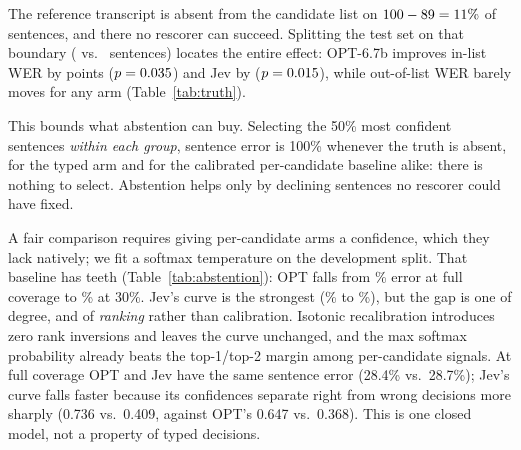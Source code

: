 \documentclass[11pt]{article}
\begin{document}
\begin{table}[t]
\centering\small

\caption{Test WER split by whether the reference transcript is in the candidate list.
Gains concentrate where the truth is present; where it is absent, no arm moves the needle.
Paired bootstrap vs.\ no rescoring within each group.}
\label{tab:truth}
\end{table}

\begin{table}[t]
\centering\small

\caption{Coverage--risk. Per-candidate arms receive a temperature-calibrated softmax over
their candidate scores, temperature fit on the development split, so they are not
disadvantaged merely by lacking a native probability.}
\label{tab:abstention}
\end{table}

The reference transcript is absent from the candidate list on $100-89 = 11\%$ of
sentences, and there no rescorer can succeed. Splitting the test set on that boundary
(\nInList{} vs.\ \nOutList{} sentences) locates the entire effect: OPT-6.7b improves
in-list WER by \optInListDelta{} points ($p=0.035$) and Jev by \jevInListDelta{}
($p=0.015$), while out-of-list WER barely moves for any arm (Table~\ref{tab:truth}).

This bounds what abstention can buy. Selecting the 50\% most confident sentences
\emph{within each group}, sentence error is 100\% whenever the truth is absent, for the
typed arm and for the calibrated per-candidate baseline alike: there is nothing to select.
Abstention helps only by declining sentences no rescorer could have fixed.

A fair comparison requires giving per-candidate arms a confidence, which they lack
natively; we fit a softmax temperature on the development split. That baseline has teeth
(Table~\ref{tab:abstention}): OPT falls from \riskOptAtHundred\% error at full coverage to
\riskOptAtThirty\% at 30\%. Jev's curve is the strongest (\riskJevAtHundred\% to
\riskJevAtThirty\%), but the gap is one of degree, and of \emph{ranking} rather than
calibration. Isotonic recalibration introduces zero rank inversions and leaves the curve
unchanged, and the max softmax probability already beats the top-1/top-2 margin among
per-candidate signals. At full coverage OPT and Jev have the same sentence error (28.4\%
vs.\ 28.7\%); Jev's curve falls faster because its confidences separate right from wrong
decisions more sharply (0.736 vs.\ 0.409, against OPT's 0.647 vs.\ 0.368). This is one
closed model, not a property of typed decisions.
\end{document}
